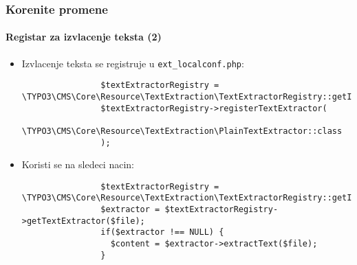 \begin{frame}[fragile]
	\frametitle{Korenite promene}
	\framesubtitle{Registar za izvlacenje teksta (2)}

	\lstset{basicstyle=\tiny\ttfamily}

	\begin{itemize}

		\item Izvlacenje teksta se registruje u \texttt{ext\_localconf.php}:

			\begin{lstlisting}
				$textExtractorRegistry = \TYPO3\CMS\Core\Resource\TextExtraction\TextExtractorRegistry::getInstance();
				$textExtractorRegistry->registerTextExtractor(
				  \TYPO3\CMS\Core\Resource\TextExtraction\PlainTextExtractor::class
				);
			\end{lstlisting}

		\item Koristi se na sledeci nacin:

			\begin{lstlisting}
				$textExtractorRegistry = \TYPO3\CMS\Core\Resource\TextExtraction\TextExtractorRegistry::getInstance();
				$extractor = $textExtractorRegistry->getTextExtractor($file);
				if($extractor !== NULL) {
				  $content = $extractor->extractText($file);
				}
			\end{lstlisting}
	\end{itemize}

\end{frame}


